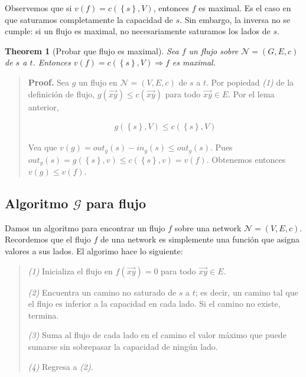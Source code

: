 \documentclass[a4paper]{article}
\newtheorem{theorem}{Theorem}
\newtheorem{theorem}{Theorem}
\begin{document}
Observemos que si $v(f) = c(\left\{ s \right\}, V)$, entonces $f$ es maximal. Es
el caso en que saturamos completamente la capacidad de $s$. Sin embargo, la
inversa no se cumple: si un flujo es maximal, no necesariamente saturamos los
lados de $s$.

\begin{theorem}[Probar que flujo es maximal]
    Sea $f$ un flujo sobre $\mathcal{N} = (G, E, c)$ de $s$ a $t$. Entonces
    $v(f) = c(\left\{ s \right\}, V) \Rightarrow f$ es maximal.
\end{theorem}


\small
\begin{quote}

\textbf{Proof.} Sea $g$ un flujo en $\mathcal{N} = (V, E, c)$ de $s$ a $t$. Por
popiedad \textit{(1)} de la definición de flujo, $g(\overrightarrow{xy}) \leq c(\overrightarrow{xy})$
para todo $\overrightarrow{xy} \in E$. Por el lema anterior, 

\begin{align*} g(\left\{ s \right\}, V) \leq c( \left\{ s \right\}, V  )\end{align*}

Vea que $v(g) = out_g(s) - in_g(s) \leq out_g(s)$. Pues $out_g(s) = g(\left\{ s
\right\}, v ) \leq c(\left\{ s \right\}, v ) = v(f)$. Obtenemos entonces $v(g)
\leq v(f)$.

\end{quote}
\normalsize

\subsection{Algoritmo $\mathscr{G}$ para flujo}

Damos un algoritmo para encontrar un flujo $f$ sobre una network $\mathcal{N} =
(V, E, c)$. Recordemos que el flujo $f$ de una network es simplemente una
función que asigna valores a sus lados. El algorimo hace lo siguiente:

\begin{quote}

    \textit{(1)} Inicializa el flujo en $f(\overrightarrow{xy}) = 0$ para todo $\overrightarrow{xy}
    \in E$. 

    \textit{(2)} Encuentra un camino no saturado de $s$ a $t$; es decir, un
    camino tal que el flujo es inferior a la capacidad en cada lado. Si el
    camino no existe, termina.

    \textit{(3)} Suma al flujo de cada lado en el camino el valor máximo que
    puede sumarse sin sobrepasar la capacidad de ningún lado.

    \textit{(4)} Regresa a \textit{(2)}.
    
\end{quote}
\end{document}
